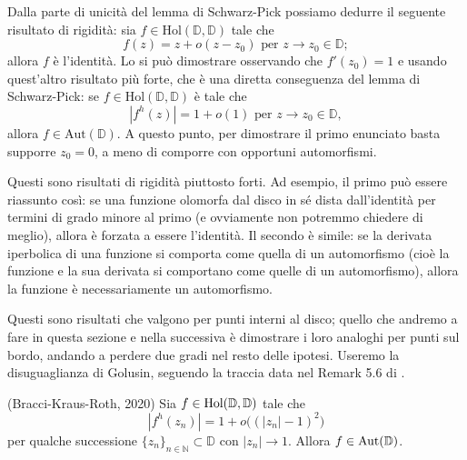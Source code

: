 Dalla parte di unicità del lemma di Schwarz-Pick possiamo dedurre il seguente risultato di rigidità: sia $f \in \text{Hol}(\mathbb{D},\mathbb{D})$ tale che
$$f(z)=z+o(z-z_0) \text{ per } z \longrightarrow z_0 \in \mathbb{D};$$
allora $f$ è l'identità. Lo si può dimostrare osservando che $f'(z_0)=1$ e usando quest'altro risultato più forte, che è una diretta conseguenza del lemma di Schwarz-Pick: se $f \in \text{Hol}(\mathbb{D},\mathbb{D})$ è tale che
$$|f^h(z)|=1+o(1) \text{ per } z \longrightarrow z_0 \in \mathbb{D},$$
allora $f \in \text{Aut}(\mathbb{D})$. A questo punto, per dimostrare il primo enunciato basta supporre $z_0=0$, a meno di comporre con opportuni automorfismi.

Questi sono risultati di rigidità piuttosto forti. Ad esempio, il primo può essere riassunto così: se una funzione olomorfa dal disco in sé dista dall'identità per termini di grado minore al primo (e ovviamente non potremmo chiedere di meglio), allora è forzata a essere l'identità. Il secondo è simile: se la derivata iperbolica di una funzione si comporta come quella di un automorfismo (cioè la funzione e la sua derivata si comportano come quelle di un automorfismo), allora la funzione è necessariamente un automorfismo.

Questi sono risultati che valgono per punti interni al disco; quello che andremo a fare in questa sezione e nella successiva è dimostrare i loro analoghi per punti sul bordo, andando a perdere due gradi nel resto delle ipotesi. Useremo la disuguaglianza di Golusin, seguendo la traccia data nel Remark 5.6 di \cite{BKR}.

\begin{thm} \label{boundary_schwarz_pick}
  (Bracci-Kraus-Roth, 2020) Sia $f \in \text{\normalfont{Hol}}(\mathbb{D},\mathbb{D})$ tale che
  \begin{equation} \label{n_o^2}
    |f^h(z_n)|=1+o\bigl((|z_n|-1)^2\bigr)
  \end{equation}
  per qualche successione $\{z_n\}_{n \in \mathbb{N}} \subset \mathbb{D}$ con $|z_n| \longrightarrow 1$. Allora $f \in \text{\normalfont{Aut}}(\mathbb{D})$.
\end{thm}

